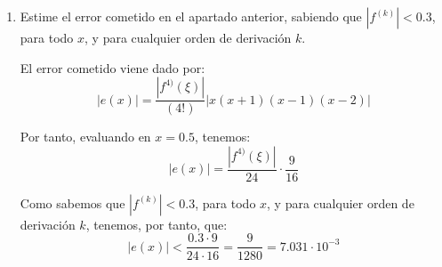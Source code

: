 \documentclass[12pt]{article}
\begin{document}
\begin{ejercicio}
\begin{enumerate}
        \item Estime el error cometido en el apartado anterior, sabiendo que $|f^{(k)}|<0.3$, para todo $x$, y para cualquier orden de derivación $k$.

        El error cometido viene dado por:
        \begin{equation*}
            |e(x)| = \frac{|f^{4)}(\xi)|}{(4!)}|x(x+1)(x-1)(x-2)|
        \end{equation*}

        Por tanto, evaluando en $x=0.5$, tenemos:
        \begin{equation*}
            |e(x)| = \frac{|f^{4)}(\xi)|}{24}\cdot \frac{9}{16}
        \end{equation*}

        Como sabemos que $|f^{(k)}|<0.3$, para todo $x$, y para cualquier orden de derivación $k$, tenemos, por tanto, que:
        \begin{equation*}
            |e(x)| < \frac{0.3\cdot 9}{24\cdot 16} = \frac{9}{1280} = 7.031\cdot 10^{-3}
        \end{equation*}
        
    \end{enumerate}
\end{ejercicio}
\end{document}
